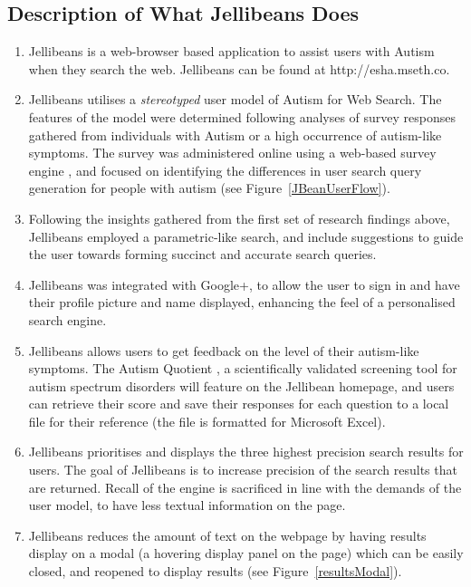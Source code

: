 \documentclass[a4paper, 11pt]{article}
\begin{document}
\subsection{Description of What Jellibeans Does}
\begin{enumerate}
\item{Jellibeans is a web-browser based application to assist users with Autism when they search the web. Jellibeans can be found at http://esha.mseth.co. }
\item{Jellibeans utilises a \textit{stereotyped} user model of Autism for Web Search. The features of the model were determined following analyses of survey responses gathered from individuals with Autism or a high occurrence of autism-like symptoms. The survey was administered online using a web-based survey engine \cite{surveymonkey}, and focused on identifying the differences in user search query generation for people with autism (see Figure~\ref{JBeanUserFlow}).}
\item{Following the insights gathered from the first set of research findings above, Jellibeans employed a parametric-like search, and include suggestions to guide the user towards forming succinct and accurate search queries.}
\item{Jellibeans was integrated with Google+, to allow the user to sign in and have their profile picture and name displayed, enhancing the feel of a personalised search engine.}
\item{Jellibeans allows users to get feedback on the level of their autism-like symptoms. The Autism Quotient \cite{Baron Cohen et al}, a scientifically validated screening tool for autism spectrum disorders will feature on the Jellibean homepage, and users can retrieve their score and save their responses for each question to a local file for their reference (the file is formatted for Microsoft Excel).}
\item{Jellibeans prioritises and displays the three highest precision search results for users. The goal of Jellibeans is to increase precision of the search results that are returned. Recall of the engine is sacrificed in line with the demands of the user model, to have less textual information on the page.}
\item{Jellibeans reduces the amount of text on the webpage by having results display on a modal (a hovering display panel on the page) which can be easily closed, and reopened to display results (see Figure~\ref{resultsModal}).

}
\end{enumerate}
\end{document}

